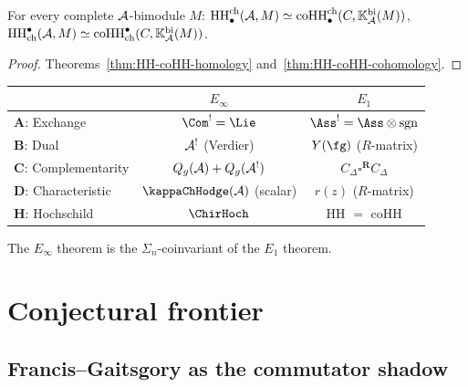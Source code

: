 \begin{theorem}
For every complete $\mathcal{A}$-bimodule $M$\textup{:}
$\operatorname{HH}^{\mathrm{ch}}_\bullet(\mathcal{A}, M)
\simeq
\operatorname{coHH}^{\mathrm{ch}}_\bullet(C, \mathbb{K}_{\mathcal{A}}^{\mathrm{bi}}(M))$,\quad
$\operatorname{HH}_{\mathrm{ch}}^\bullet(\mathcal{A}, M)
\simeq
\operatorname{coHH}_{\mathrm{ch}}^\bullet(C, \mathbb{K}_{\mathcal{A}}^{\mathrm{bi}}(M))$.
\end{theorem}

\begin{proof}
Theorems~\ref{thm:HH-coHH-homology}
and~\ref{thm:HH-coHH-cohomology}.
\end{proof}

\begin{remark}[$E_1$ vs $E_\infty$]
\begin{center}
\renewcommand{\arraystretch}{1.15}
\begin{tabular}{lcc}
\toprule
& \emph{$E_\infty$} & \emph{$E_1$} \\
\midrule
\textbf{A}: Exchange
 & $\Com^! = \Lie$
 & $\Ass^! = \Ass \otimes \mathrm{sgn}$ \\
\textbf{B}: Dual
 & $\mathcal{A}^!$ (Verdier)
 & $Y(\fg)$ ($R$-matrix) \\
\textbf{C}: Complementarity
 & $Q_g(\mathcal{A}) + Q_g(\mathcal{A}^!)$
 & $C_\Delta \square^{\mathbf{R}} C_\Delta$ \\
\textbf{D}: Characteristic
 & $\kappaChHodge(\cA)$ (scalar)
 & $r(z)$ ($R$-matrix) \\
\textbf{H}: Hochschild
 & $\ChirHoch$
 & HH $=$ coHH \\
\bottomrule
\end{tabular}
\end{center}
The $E_\infty$ theorem is the $\Sigma_n$-coinvariant of the $E_1$ theorem.
\end{remark}


\section{Conjectural frontier}

\subsection{Francis--Gaitsgory as the commutator shadow}

